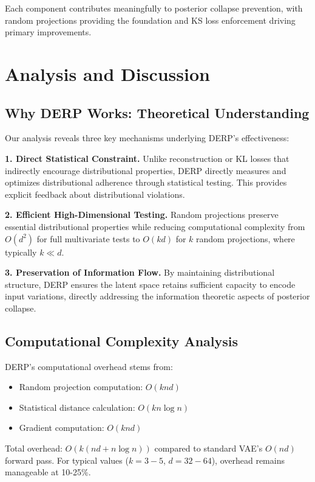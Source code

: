 \documentclass{article}
\begin{document}
Each component contributes meaningfully to posterior collapse prevention, with random projections providing the foundation and KS loss enforcement driving primary improvements.

\section{Analysis and Discussion}

\subsection{Why DERP Works: Theoretical Understanding}

Our analysis reveals three key mechanisms underlying DERP's effectiveness:

\textbf{1. Direct Statistical Constraint.} Unlike reconstruction or KL losses that indirectly encourage distributional properties, DERP directly measures and optimizes distributional adherence through statistical testing. This provides explicit feedback about distributional violations.

\textbf{2. Efficient High-Dimensional Testing.} Random projections preserve essential distributional properties while reducing computational complexity from $O(d^2)$ for full multivariate tests to $O(kd)$ for $k$ random projections, where typically $k \ll d$.

\textbf{3. Preservation of Information Flow.} By maintaining distributional structure, DERP ensures the latent space retains sufficient capacity to encode input variations, directly addressing the information theoretic aspects of posterior collapse.

\subsection{Computational Complexity Analysis}

DERP's computational overhead stems from:
\begin{itemize}
\item Random projection computation: $O(knd)$ 
\item Statistical distance calculation: $O(kn \log n)$
\item Gradient computation: $O(knd)$
\end{itemize}

Total overhead: $O(k(nd + n \log n))$ compared to standard VAE's $O(nd)$ forward pass. For typical values ($k=3-5$, $d=32-64$), overhead remains manageable at 10-25\%.
\end{document}
